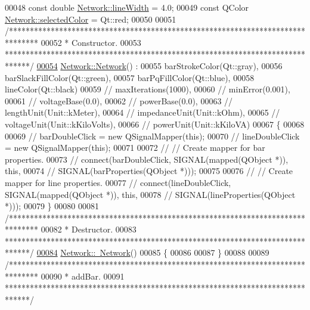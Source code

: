 \begin{DoxyCode}
00048 \textcolor{keyword}{const} \textcolor{keywordtype}{double} \hyperlink{group___graphics_ga3f810634c9908d62d33a1ab09a76c147}{Network::lineWidth} = 4.0;
00049 \textcolor{keyword}{const} QColor \hyperlink{group___graphics_gaa9e21b8e2a24b0495e776a51e1aeed94}{Network::selectedColor} = Qt::red;
00050 
00051 \textcolor{comment}{/*******************************************************************************}
00052 \textcolor{comment}{ * Constructor.}
00053 \textcolor{comment}{ ******************************************************************************/}
\hypertarget{network_8cpp_source_l00054}{}\hyperlink{group___graphics_ga3cc2fb4f8fa4d507077e8da85ce5a1c8}{00054} \hyperlink{group___graphics_ga3cc2fb4f8fa4d507077e8da85ce5a1c8}{Network::Network}() :
00055   barStrokeColor(Qt::gray),
00056   barSlackFillColor(Qt::green),
00057   barPqFillColor(Qt::blue),
00058   lineColor(Qt::black)
00059 \textcolor{comment}{//  maxIterations(1000),}
00060 \textcolor{comment}{//  minError(0.001),}
00061 \textcolor{comment}{//  voltageBase(0.0),}
00062 \textcolor{comment}{//  powerBase(0.0),}
00063 \textcolor{comment}{//  lengthUnit(Unit::kMeter),}
00064 \textcolor{comment}{//  impedanceUnit(Unit::kOhm),}
00065 \textcolor{comment}{//  voltageUnit(Unit::kKiloVolts),}
00066 \textcolor{comment}{//  powerUnit(Unit::kKiloVA)}
00067 \{
00068 
00069 \textcolor{comment}{//  barDoubleClick = new QSignalMapper(this);}
00070 \textcolor{comment}{//  lineDoubleClick = new QSignalMapper(this);}
00071 
00072 \textcolor{comment}{//  // Create mapper for bar properties.}
00073 \textcolor{comment}{//  connect(barDoubleClick, SIGNAL(mapped(QObject *)), this,}
00074 \textcolor{comment}{//  SIGNAL(barProperties(QObject *)));}
00075 
00076 \textcolor{comment}{//  // Create mapper for line properties.}
00077 \textcolor{comment}{//  connect(lineDoubleClick, SIGNAL(mapped(QObject *)), this,}
00078 \textcolor{comment}{//  SIGNAL(lineProperties(QObject *)));}
00079 \}
00080 
00081 \textcolor{comment}{/*******************************************************************************}
00082 \textcolor{comment}{ * Destructor.}
00083 \textcolor{comment}{ ******************************************************************************/}
\hypertarget{network_8cpp_source_l00084}{}\hyperlink{group___graphics_ga7a4e19cdb4bf0c7ecf82baa643831492}{00084} \hyperlink{group___graphics_ga7a4e19cdb4bf0c7ecf82baa643831492}{Network::~Network}()
00085 \{
00086 
00087 \}
00088 
00089 \textcolor{comment}{/*******************************************************************************}
00090 \textcolor{comment}{ * addBar.}
00091 \textcolor{comment}{ ******************************************************************************/}

\end{DoxyCode}
